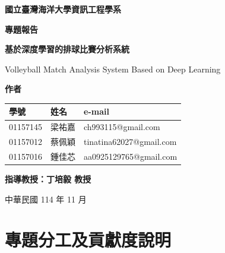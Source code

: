\documentclass[a4paper,14pt,oneside]{article}
\begin{document}
\begin{titlepage}
    \centering
    \vspace*{2cm}
    
    {\Huge\bfseries 國立臺灣海洋大學資訊工程學系\par}
    \vspace{1cm}
    {\Huge\bfseries 專題報告\par}
    
    \vspace{3cm}
    
    {\huge\bfseries 基於深度學習的排球比賽分析系統\par}
    \vspace{0.5cm}
    {\Large Volleyball Match Analysis System Based on Deep Learning\par}
    
    \vspace{3cm}
    
    {\Large\bfseries 作者\par}
    \vspace{0.5cm}
    \begin{tabular}{lll}
        \Large 學號 & \Large 姓名 & \Large e-mail \\
        \hline
        \Large 01157145 & \Large 梁祐嘉 & \Large ch993115@gmail.com \\
        \Large 01157012 & \Large 蔡佩穎 & \Large tinatina62027@gmail.com \\
        \Large 01157016 & \Large 鍾佳芯 & \Large aa0925129765@gmail.com \\
    \end{tabular}
    
    \vspace{2cm}
    
    {\Large\bfseries 指導教授：丁培毅 教授\par}
    
    \vfill
    
    {\Large 中華民國 114 年 11 月\par}
\end{titlepage}

\newpage
\section*{專題分工及貢獻度說明}
\end{document}
